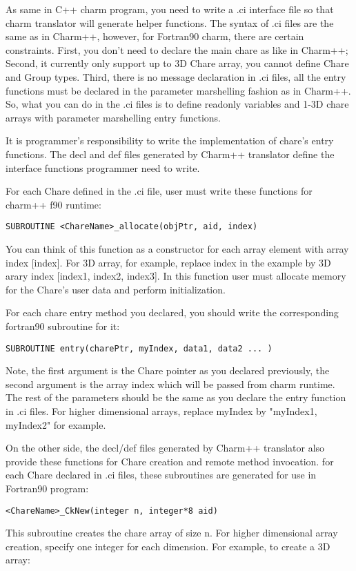 \documentclass[11pt]{article}
\begin{document}
As same in C++ charm program, you need to write a .ci interface file
so that charm translator will generate helper functions. The syntax of .ci files
are the same as in Charm++, however, for Fortran90 charm, there are certain
constraints. First, you don't need to declare the main chare as like in Charm++;
Second, it currently only support up to 3D Chare array, you cannot define 
Chare and Group types. Third, there is no message declaration in .ci files, 
all the entry functions must be declared in the parameter marshelling 
fashion as in Charm++.
So, what you can do in the .ci files is to define readonly variables and 1-3D
chare arrays with parameter marshelling entry functions.

It is programmer's responsibility to write the implementation of chare's
entry functions. The decl and def files generated by Charm++ translator define
the interface functions programmer need to write.

For each Chare defined in the .ci file, user must write these functions
for charm++ f90 runtime:

  \verb+SUBROUTINE <ChareName>_allocate(objPtr, aid, index)+

  You can think of this function as a constructor for each array element 
with array index [index]. For 3D array, for example, replace index in the 
example by 3D arary index [index1, index2, index3]. 
In this function user must allocate memory for 
the Chare's user data and perform initialization.

  For each chare entry method you declared, you should write the corresponding 
fortran90 subroutine for it:

  \verb+SUBROUTINE entry(charePtr, myIndex, data1, data2 ... )+

  Note, the first argument is the Chare pointer as you declared previously, the second argument is the array index which will be passed from charm runtime. 
The rest of the parameters should be the same as you declare the entry function
in .ci files. For higher dimensional arrays, replace myIndex by "myIndex1, myIndex2" for example.

On the other side, the decl/def files generated by Charm++ translator also
provide these functions for Chare creation and remote method invocation. 
for each Chare declared in .ci files, these subroutines are generated for use
 in Fortran90 program:

  \verb+<ChareName>_CkNew(integer n, integer*8 aid)+

  This subroutine creates the chare array of size n. For higher dimensional
array creation, specify one integer for each dimension. For example, to create
a 3D array:
\end{document}
